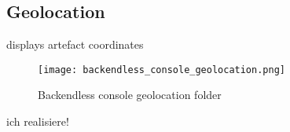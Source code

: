 \subsection{Geolocation}
displays artefact coordinates

\begin{figure}[H]
	\centering \texttt{[image: backendless\_console\_geolocation.png]}
	\caption[Backendless console geolocation]{Backendless console geolocation folder}
	\label{fig:backendlessConsoleGeolocation}
\end{figure}

ich realisiere!